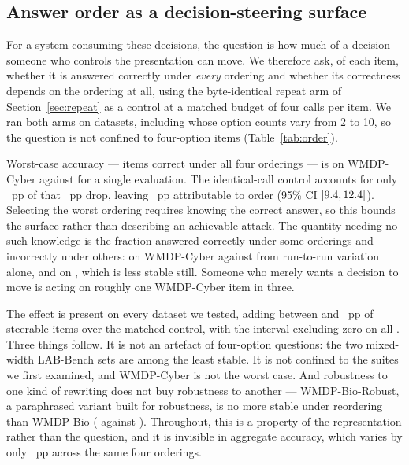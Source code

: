 \documentclass[conference]{IEEEtran}
\begin{document}
\subsection{Answer order as a decision-steering surface}
\label{sec:attack}

For a system consuming these decisions, the question is how much of a decision someone who
controls the presentation can move. We therefore ask, of each item, whether it is answered
correctly under \emph{every} ordering and whether its correctness depends on the ordering
at all, using the byte-identical repeat arm of Section~\ref{sec:repeat} as a control at a
matched budget of four calls per item. We ran both arms on \statAtkNDatasets{} datasets,
including \statAtkNMixedWidth{} whose option counts vary from 2 to 10, so the question is
not confined to four-option items (Table~\ref{tab:order}).



Worst-case accuracy --- items correct under all four orderings --- is
\statAtkWorstRotCyber{} on WMDP-Cyber against \statAtkSingleCyber{} for a single
evaluation. The identical-call control accounts for only \statAtkDropIdentCyber{}~pp of
that \statAtkDropRotCyber{}~pp drop, leaving \statAtkOrderDropCyber{}~pp attributable to
order (95\% CI $[9.4, 12.4]{}$). Selecting the worst ordering requires knowing
the correct answer, so this bounds the surface rather than describing an achievable attack.
The quantity needing no such knowledge is the fraction answered correctly under some
orderings and incorrectly under others: \statAtkSteerRotCyber{} on WMDP-Cyber against
\statAtkSteerIdentCyber{} from run-to-run variation alone, and
\statAtkWorstSteer{} on \statAtkWorstLabel{}, which is less stable still. Someone who
merely wants a decision to move is acting on roughly one WMDP-Cyber item in three.

The effect is present on every dataset we tested, adding between \statAtkOrderMin{} and
\statAtkOrderMax{}~pp of steerable items over the matched control, with the interval
excluding zero on all \statAtkNSignificant{}. Three things follow. It is not an artefact of
four-option questions: the two mixed-width LAB-Bench sets are among the least stable.
It is not confined to the suites we first examined, and WMDP-Cyber is not the worst case.
And robustness to one kind of rewriting does not buy robustness to another --- WMDP-Bio-Robust, a
paraphrased variant built for robustness, is no more stable under reordering than WMDP-Bio
(\statAtkSteerRotBioRobust{} against \statAtkSteerRotBio{}). Throughout, this is a property
of the representation rather than the question, and it is invisible in aggregate accuracy,
which varies by only \statRotSpreadCyber{}~pp across the same four orderings.
\end{document}
